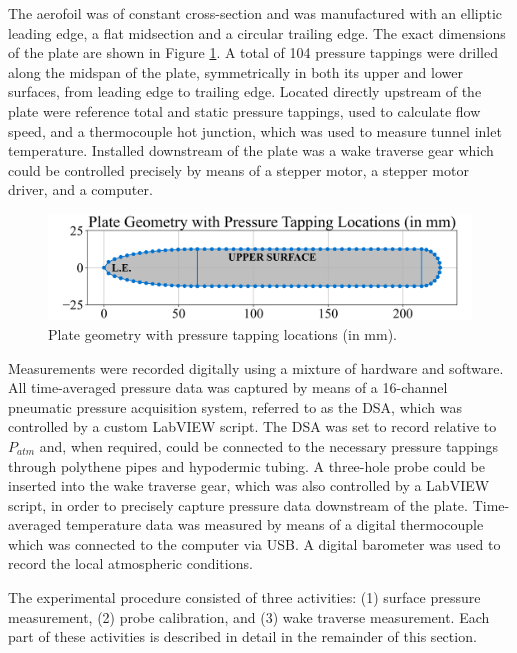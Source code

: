 \documentclass[11pt,a4paper,twocolumn]{article}
\begin{document}
The aerofoil was of constant cross-section and was manufactured with an elliptic leading edge, a flat midsection and a circular trailing edge. The exact dimensions of the plate are shown in Figure \ref{exp_1_fig1}. A total of 104 pressure tappings were drilled along the midspan of the plate, symmetrically in both its upper and lower surfaces, from leading edge to trailing edge. Located directly upstream of the plate were reference total and static pressure tappings, used to calculate flow speed, and a thermocouple hot junction, which was used to measure tunnel inlet temperature. Installed downstream of the plate was a wake traverse gear which could be controlled precisely by means of a stepper motor, a stepper motor driver, and a computer. 

\begin{figure}[!ht]
{\centering
\includegraphics[width = \columnwidth]{exp_1_plate_geometry.png}
\caption{Plate geometry with pressure tapping locations (in mm).}
\label{exp_1_fig1}}
\end{figure}

Measurements were recorded digitally using a mixture of hardware and software. All time-averaged pressure data was captured by means of a 16-channel pneumatic pressure acquisition system, referred to as the DSA, which was controlled by a custom LabVIEW script. The DSA was set to record relative to $P_{atm}$ and, when required, could be connected to the necessary pressure tappings through polythene pipes and hypodermic tubing. A three-hole probe could be inserted into the wake traverse gear, which was also controlled by a LabVIEW script, in order to precisely capture pressure data downstream of the plate. Time-averaged temperature data was measured by means of a digital thermocouple which was connected to the computer via USB. A digital barometer was used to record the local atmospheric conditions.

The experimental procedure consisted of three activities: (1) surface pressure measurement, (2) probe calibration, and (3) wake traverse measurement. Each part of these activities is described in detail in the remainder of this section. 
\end{document}

